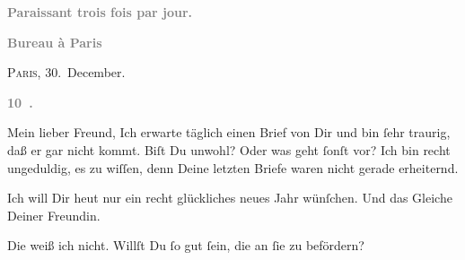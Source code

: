 \pstart
           \begin{otherlanguage}{french}\textcolor{gray}{\textbf{\textbf{Paraissant trois fois par jour.}}}\end{otherlanguage}\pend
           
\pstart
           \begin{otherlanguage}{french}\textcolor{gray}{\textbf{\textbf{Bureau à Paris}}}\end{otherlanguage}\hfill \textsc{Paris}, 30. December.\pend
           
\pstart
           \begin{otherlanguage}{french}\textcolor{gray}{\textbf{\textbf{10 .}}}\end{otherlanguage}\pend
           
\pstart\center{}Mein lieber Freund,\pend\vspace{0.5em}
\pstart
           Ich erwarte täglich einen Brief von Dir und bin ſehr traurig, daß er gar nicht kommt.
               Biſt Du unwohl? Oder was geht ſonſt vor? Ich bin recht ungeduldig, es zu wiſſen, denn
               Deine letzten Briefe waren nicht gerade erheiternd.\pend
           
\pstart
           Ich will Dir heut nur ein recht glückliches neues Jahr
               wünſchen. Und das Gleiche Deiner Freundin.\pend
           
\pstart
           Die \label{K_L02835-1v}\label{K_L02835-1} weiß ich nicht. Willſt Du ſo gut ſein, die \label{K_L02835-2v}\label{K_L02835-2} an ſie zu befördern?\pend
           
